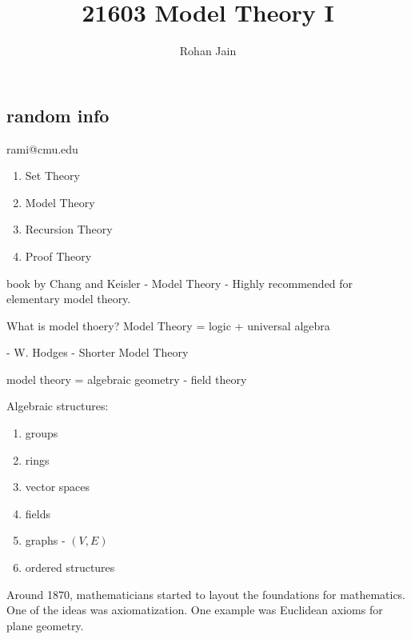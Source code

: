 \documentclass{report}
\title{\Huge{21603 Model Theory I}}
\author{\huge{Rohan Jain}}
\date{}
\begin{document}
\newcommand{\term}{\text{Term}}
\newcommand{\fml}{\text{Fml}}
\newcommand{\afml}{\text{AFml}}
\newcommand{\fv}{\text{FV}}
\newcommand{\sent}{\text{Sent}}
\newcommand{\val}{\text{Val}}
\newcommand{\Mod}{\text{Mod}}
\newcommand{\Th}{\text{Th}}

\maketitle
\newpage%
\tableofcontents

\pagebreak

\chapter{}
\section{random info}
rami@cmu.edu
\begin{enumerate}
    \item Set Theory
    \item Model Theory
    \item Recursion Theory
    \item Proof Theory
\end{enumerate}

 book by Chang and Keisler - Model Theory - Highly recommended for elementary model theory. 

\noindent What is model thoery? Model Theory = logic + universal algebra

 - W. Hodges - Shorter Model Theory

\noindent model theory = algebraic geometry - field theory

\noindent Algebraic structures:
\begin{enumerate}
    \item groups
    \item rings
    \item vector spaces 
    \item fields
    \item graphs - $(V, E)$
    \item ordered structures
\end{enumerate}

Around 1870, mathematicians started to layout the foundations for mathematics. One of the ideas was axiomatization. One example was Euclidean axioms for plane geometry. 
\end{document}
